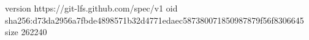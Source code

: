 version https://git-lfs.github.com/spec/v1
oid sha256:d73da2956a7fbde4898571b32d4771edaec587380071850987879f56f8306645
size 262240
